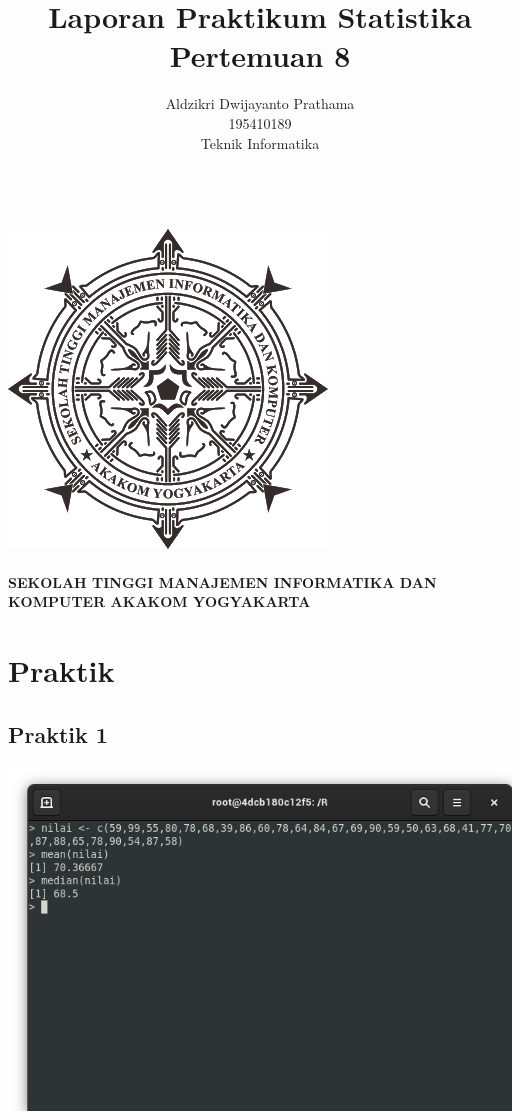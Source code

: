\documentclass[a4paper,12pt]{article}
\begin{document}
\title{Laporan Praktikum Statistika Pertemuan 8}
\author{Aldzikri Dwijayanto Prathama 
	\\195410189
	\\Teknik Informatika}
\makeatletter
\begin{titlepage}
	\begin{center}
		{\huge \bfseries \@title }\\[14ex]
		\includegraphics[scale=.8]{logo}\\[4ex]
		{\large \@author}\\[20ex]
		{\large \bfseries {SEKOLAH TINGGI MANAJEMEN INFORMATIKA DAN KOMPUTER
				AKAKOM YOGYAKARTA}}
	\end{center}


\end{titlepage}
\makeatother
\newpage
\section{Praktik}
\subsection{Praktik 1}
\includegraphics[width=\linewidth]{praktik01}
\end{document}
